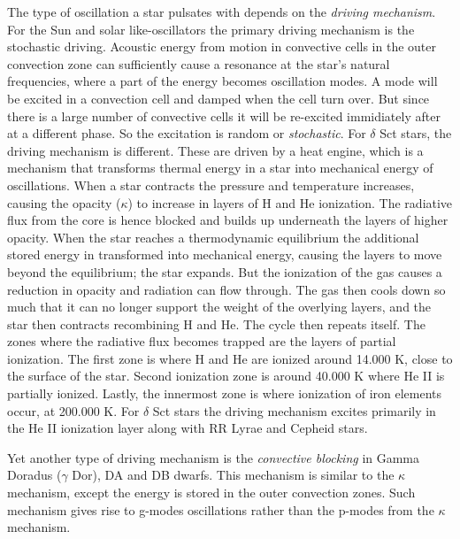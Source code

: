 The type of oscillation a star pulsates with depends on the \textit{driving mechanism}. For the Sun and solar like-oscillators the primary driving mechanism is the stochastic driving. Acoustic energy from motion in convective cells in the outer convection zone can sufficiently cause a resonance at the star's natural frequencies, where a part of the energy becomes oscillation modes. A mode will be excited in a convection cell and damped when the cell turn over. But since there is a large number of convective cells it will be re-excited immidiately after at a different phase. So the excitation is random or \textit{stochastic}. 
For $\delta$ Sct stars, the driving mechanism is different. These are driven by a heat engine, which is a mechanism that transforms thermal energy in a star into mechanical energy of oscillations. When a star contracts the pressure and temperature increases, causing the opacity ($\kappa$) to increase in layers of H and He ionization. The radiative flux from the core is hence blocked and builds up underneath the layers of higher opacity. When the star reaches a thermodynamic equilibrium the additional stored energy in transformed into mechanical energy, causing the layers to move beyond the equilibrium; the star expands. But the ionization of the gas causes a reduction in opacity and radiation can flow through. The gas then cools down so much that it can no longer support the weight of the overlying layers, and the star then contracts recombining H and He. The cycle then repeats itself. 
The zones where the radiative flux becomes trapped are the layers of partial ionization. The first zone is where H and He are ionized around 14.000 K, close to the surface of the star. Second ionization zone is around 40.000 K where He II is partially ionized. Lastly, the innermost zone is where ionization of iron elements occur, at 200.000 K. For $\delta$ Sct stars the driving mechanism excites primarily in the He II ionization layer along with RR Lyrae and Cepheid stars. 

Yet another type of driving mechanism is the \textit{convective blocking} in Gamma Doradus ($\gamma$ Dor), DA and DB dwarfs. This mechanism is similar to the $\kappa$ mechanism, except the energy is stored in the outer convection zones. Such mechanism gives rise to g-modes oscillations rather than the p-modes from the $\kappa$ mechanism. 

